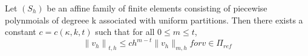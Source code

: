 \begin{thmx}
    Let $(S_h)$ be an affine family of finite elements consisting of piecewise polynmoials of degreee k associated with uniform partitions. Then there exists a constant $c = c(\kappa, k, t)$ such that for all $0 \leq m \leq t$,
    \begin{equation}
        {\|v_h\|}_{t,h} \leq ch^{m-t}\|v_h\|_{m,h} for v \in \Pi_{ref}
    \end{equation}
\end{thmx}
